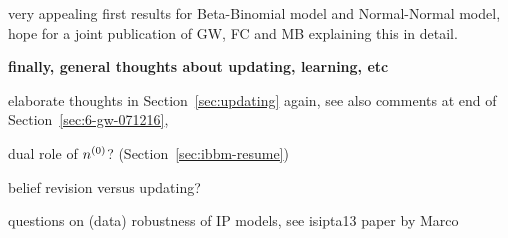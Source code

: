 very appealing first results for Beta-Binomial model and Normal-Normal model,
hope for a joint publication of GW, FC and MB explaining this in detail.


\textbf{finally, general thoughts about updating, learning, etc}

elaborate thoughts in Section~\ref{sec:updating} again,
see also comments at end of Section~\ref{sec:6-gw-071216},

dual role of $n^{(0)}$? (Section~\ref{sec:ibbm-resume})

belief revision versus updating?

questions on (data) robustness of IP models, see isipta13 paper by Marco


